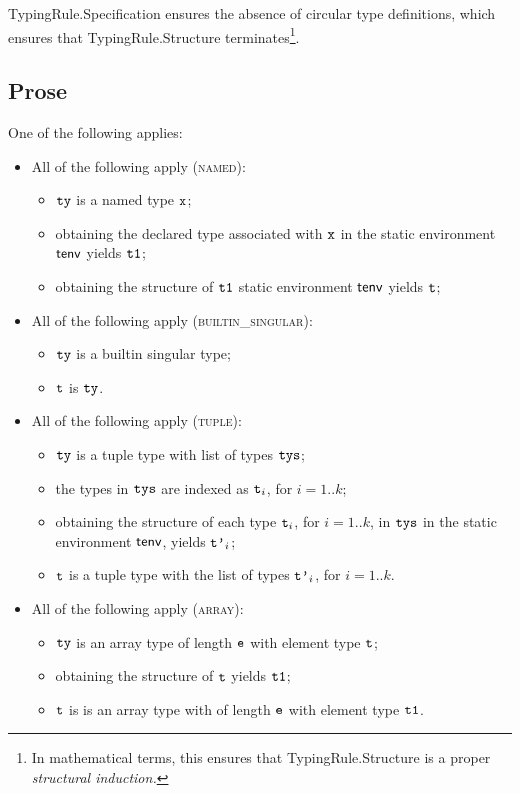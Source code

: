 TypingRule.Specification ensures the absence of circular type definitions,
which ensures that TypingRule.Structure terminates\footnote{In mathematical terms,
this ensures that TypingRule.Structure is a proper \emph{structural induction.}}.

\subsection{Prose}
One of the following applies:
\begin{itemize}
\item All of the following apply (\textsc{named}):
  \begin{itemize}
  \item $\texttt{ty}$ is a named type $\texttt{x}$;
  \item obtaining the declared type associated with $\texttt{x}$ in the static environment $\textsf{tenv}$ yields $\texttt{t1}$\ProseOrTypeError;
  \item obtaining the structure of $\texttt{t1}$ static environment $\textsf{tenv}$ yields $\texttt{t}$\ProseOrTypeError;
  \end{itemize}
\item All of the following apply (\textsc{builtin\_singular}):
  \begin{itemize}
  \item $\texttt{ty}$ is a builtin singular type;
  \item $\texttt{t}$ is $\texttt{ty}$.
  \end{itemize}
\item All of the following apply (\textsc{tuple}):
  \begin{itemize}
  \item $\texttt{ty}$ is a tuple type with list of types $\texttt{tys}$;
  \item the types in $\texttt{tys}$ are indexed as $\texttt{t}_i$, for $i=1..k$;
  \item obtaining the structure of each type $\texttt{t}_i$, for $i=1..k$, in $\texttt{tys}$ in the static environment $\textsf{tenv}$,
  yields $\texttt{t'}_i$\ProseOrTypeError;
  \item $\texttt{t}$ is a tuple type with the list of types $\texttt{t'}_i$, for $i=1..k$.
  \end{itemize}
\item All of the following apply (\textsc{array}):
  \begin{itemize}
    \item $\texttt{ty}$ is an array type of length $\texttt{e}$ with element type $\texttt{t}$;
    \item obtaining the structure of $\texttt{t}$ yields $\texttt{t1}$\ProseOrTypeError;
    \item $\texttt{t}$ is is an array type with of length $\texttt{e}$ with element type $\texttt{t1}$.

\end{itemize}
\end{itemize}
